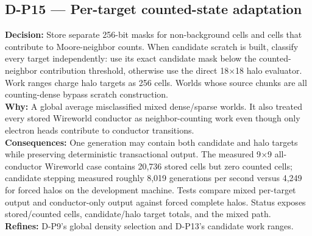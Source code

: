\subsection*{D-P15 --- Per-target counted-state adaptation}
\begin{decisionbox}[title={D-P15 \quad 2026-08-08}]
\textbf{Decision:} Store separate 256-bit masks for non-background cells and
cells that contribute to Moore-neighbor counts. When candidate scratch is
built, classify every target independently: use its exact candidate mask below
the counted-neighbor contribution threshold, otherwise use the direct
18$\times$18 halo evaluator. Work ranges charge halo targets as 256 cells.
Worlds whose source chunks are all counting-dense bypass scratch construction.\\
\textbf{Why:} A global average misclassified mixed dense/sparse worlds. It also
treated every stored Wireworld conductor as neighbor-counting work even though
only electron heads contribute to conductor transitions.\\
\textbf{Consequences:} One generation may contain both candidate and halo
targets while preserving deterministic transactional output. The measured
9$\times$9 all-conductor Wireworld case contains 20,736 stored cells but zero
counted cells; candidate stepping measured roughly 8,019 generations per second
versus 4,249 for forced halos on the development machine. Tests compare mixed
per-target output and conductor-only output against forced complete halos.
Status exposes stored/counted cells, candidate/halo target totals, and the mixed
path.\\
\textbf{Refines:} D-P9's global density selection and D-P13's candidate work
ranges.
\end{decisionbox}

